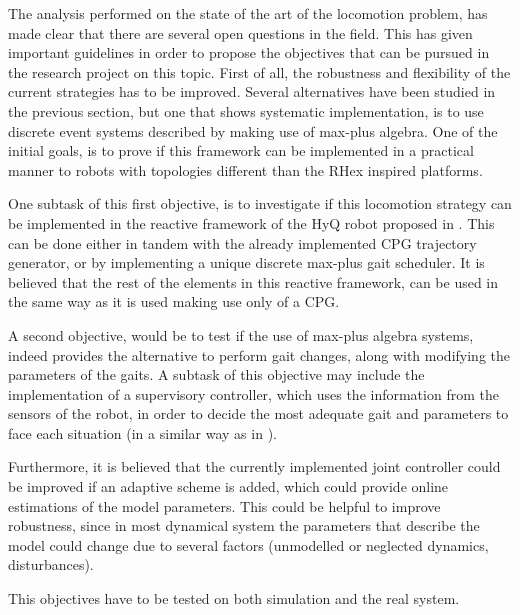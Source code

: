 \documentclass[../main.tex]{subfiles}
\begin{document}
The analysis performed on the state of the art of the locomotion problem, has made clear that there are several open questions in the field. This has given important guidelines in order to propose the objectives that can be pursued in the research project on this topic. First of all, the robustness and flexibility of the current strategies has to be improved. Several alternatives have been studied in the previous section, but one that shows systematic implementation, is to use discrete event systems described by making use of max-plus algebra. One of the initial goals, is to prove if this framework can be implemented in a practical manner to robots with topologies different than the RHex inspired platforms. 

One subtask of this first objective, is to investigate if this locomotion strategy can be implemented in the reactive framework of the HyQ robot proposed in \cite{Barasuola}. This can be done either in tandem with the already implemented CPG trajectory generator, or by implementing a unique discrete max-plus gait scheduler. It is believed that the rest of the elements in this reactive framework, can be used in the same way as it is used making use only of a CPG. 

A second objective, would be to test if the use of max-plus algebra systems, indeed provides the alternative to perform gait changes, along with modifying the parameters of the gaits. A subtask of this objective may include the implementation of a supervisory controller, which uses the information from the sensors of the robot, in order to decide the most adequate gait and parameters to face each situation (in a similar way as in \cite{Barasuol}). 

Furthermore, it is believed that the currently implemented joint controller could be improved if an adaptive scheme is added, which could provide online estimations of the model parameters. This could be helpful to improve robustness, since in most dynamical system the parameters that describe the model could change due to several factors (unmodelled or neglected dynamics, disturbances).

This objectives have to be tested on both simulation and the real system. 

\iffalse
\begin{itemize}
	\item Describe objectives with respect to robust locomotion generation (sub-objectives)
	\item Describe objectives with respect to implementation of max-plus in current system (sub-objectives)
\end{itemize}
\fi 
\end{document}
